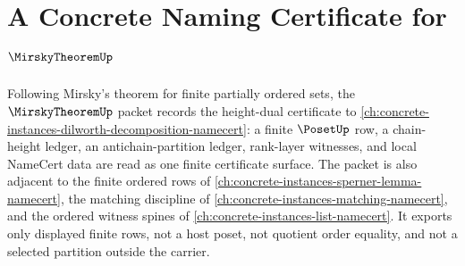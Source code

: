 \chapter{A Concrete Naming Certificate for $\MirskyTheoremUp$}
\label{ch:concrete-instances-mirsky-theorem-namecert}

Following Mirsky's theorem for finite partially ordered sets, the $\MirskyTheoremUp$ packet records the height-dual certificate to \autoref{ch:concrete-instances-dilworth-decomposition-namecert}: a finite $\PosetUp$ row, a chain-height ledger, an antichain-partition ledger, rank-layer witnesses, and local NameCert data are read as one finite certificate surface. The packet is also adjacent to the finite ordered rows of \autoref{ch:concrete-instances-sperner-lemma-namecert}, the matching discipline of \autoref{ch:concrete-instances-matching-namecert}, and the ordered witness spines of \autoref{ch:concrete-instances-list-namecert}. It exports only displayed finite rows, not a host poset, not quotient order equality, and not a selected partition outside the carrier.

